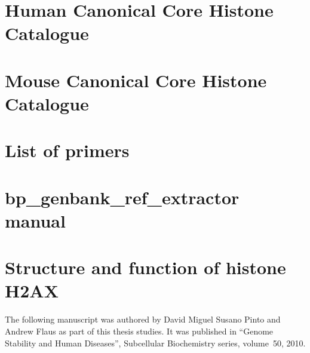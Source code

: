 \appendix

\chapter{Human Canonical Core Histone Catalogue}
  \begingroup
  \newcommand{\ResultsDir}{results-homo-sapiens}
  \newcommand{\FigsDir}{figs-homo-sapiens}
  \newcommand{\ReferenceDir}{data/reference-homo-sapiens}
  \endgroup

\chapter{Mouse Canonical Core Histone Catalogue}
  \label{ch:mouse-catalogue}
  \begingroup
  \newcommand{\ResultsDir}{results-mus-musculus}
  \newcommand{\FigsDir}{figs-mus-musculus}
  \newcommand{\ReferenceDir}{data/reference-mus-musculus/}
  \endgroup

\chapter{List of primers}
  \label{app:primers}
  \begin{description}
  
  \end{description}

\chapter{bp\_genbank\_ref\_extractor manual}
  \label{app:pod-doc}
  

\chapter{Structure and function of histone H2AX}
  \label{app:h2ax-review}

  The following manuscript was authored by David Miguel Susano Pinto and
  Andrew Flaus as part of this thesis studies. It was published in ``Genome
  Stability and Human Diseases'', Subcellular Biochemistry series, volume~50,
  2010.

  
